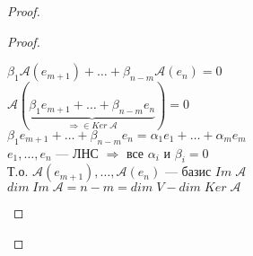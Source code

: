 \begin{theorem-non}
\begin{proof}
\begin{proof}
            \begin{center}
                $\beta_1\mathcal{A}(e_{m+1}) + \dots + \beta_{n - m}\mathcal{A}(e_{n}) = 0$ \\
                 $\mathcal{A}(
                     \underbrace{\beta_1e_{m+1} + \dots + \beta_{n-m}e_n}_{\text{$\Rightarrow \in Ker \; \mathcal{A}$}}
                     ) = 0$ \\
                    $\beta_1e_{m+1} + \dots + \beta_{n-m}e_n = \alpha_1e_1 + \dots + \alpha_me_m$ \\
                    $e_1, \dots, e_n$ --- ЛНС $\Longrightarrow $ все $\alpha_i$ и $ \beta_i = 0$ \\
                    Т.о. $\mathcal{A}(e_{m+1}), \dots, \mathcal{A}(e_n)$ --- базис $Im \; \mathcal{A}$ \\
                    $dim \; Im \; \mathcal{A} = n - m = dim \; V - dim \; Ker \; \mathcal{A}$
            \end{center}


        \end{proof}
    \end{proof}

\end{theorem-non}
